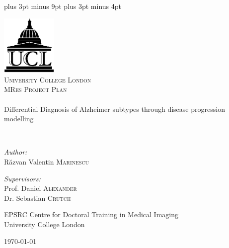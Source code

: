 \documentclass[12pt,a4paper,oneside]{report}
\begin{document}
\belowdisplayskip=12pt plus 3pt minus 9pt
\belowdisplayshortskip=7pt plus 3pt minus 4pt


\begin{titlepage}
\begin{center}

\includegraphics[width=0.2\textwidth]{ucl-logo2}~\\[1cm]

\textsc{\LARGE University College London}\\[1.5cm]

\textsc{\Large MRes Project Plan}\\[0.5cm]

\HRule \\[0.4cm]
{ \Large Differential Diagnosis of Alzheimer subtypes through disease progression modelling \\[0.4cm] }

\HRule \\[1.5cm]

\begin{minipage}{0.4\textwidth}
\begin{flushleft} \large
\emph{Author:}\\
R\u{a}zvan Valentin \textsc{Marinescu}
\end{flushleft}
\end{minipage}
\begin{minipage}{0.4\textwidth}
\begin{flushright} \large
\emph{Supervisors:} \\
Prof. Daniel \textsc{Alexander}\\
Dr. Sebastian \textsc{Crutch}
\end{flushright}
\end{minipage}

\vfill

EPSRC Centre for Doctoral Training in Medical Imaging\\ University College London

\vfill

{\large \today}

\end{center}
\end{titlepage}
\end{document}
